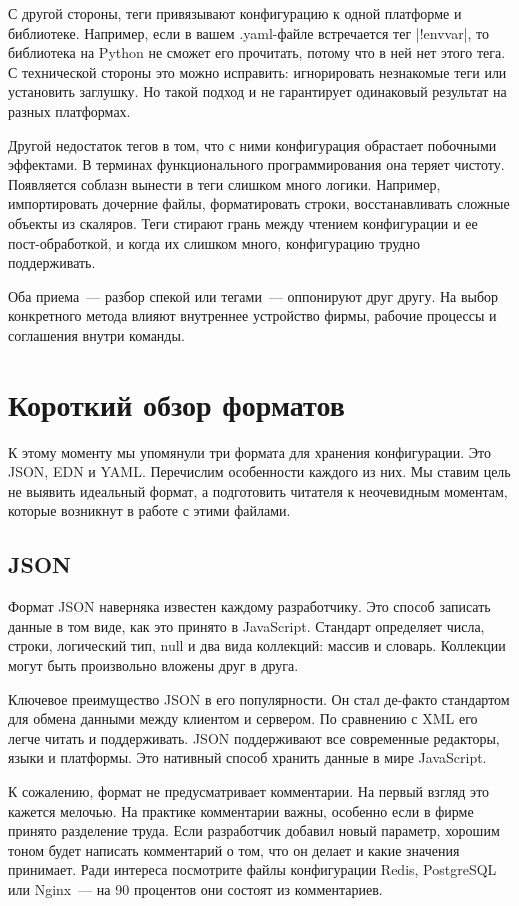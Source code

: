 С другой стороны, теги привязывают конфигурацию к одной платформе и
библиотеке. Например, если в вашем .yaml-файле встречается тег \spverb|!envvar|, то
библиотека на Python не сможет его прочитать, потому что в ней нет этого тега. С
технической стороны это можно исправить: игнорировать незнакомые теги или
установить заглушку. Но такой подход и не гарантирует одинаковый результат на
разных платформах.

Другой недостаток тегов в том, что с ними конфигурация обрастает побочными
эффектами. В терминах функционального программирования она теряет
чистоту. Появляется соблазн вынести в теги слишком много логики. Например,
импортировать дочерние файлы, форматировать строки, восстанавливать сложные
объекты из скаляров. Теги стирают грань между чтением конфигурации и ее
пост-обработкой, и когда их слишком много, конфигурацию трудно поддерживать.

Оба приема~--- разбор спекой или тегами~--- оппонируют друг другу. На выбор
конкретного метода влияют внутреннее устройство фирмы, рабочие процессы и
соглашения внутри команды.

\section{Короткий обзор форматов}

К этому моменту мы упомянули три формата для хранения конфигурации. Это JSON,
EDN и YAML. Перечислим особенности каждого из них. Мы ставим цель не выявить
идеальный формат, а подготовить читателя к неочевидным моментам, которые
возникнут в работе с этими файлами.

\subsection{JSON}

Формат JSON наверняка известен каждому разработчику. Это способ записать данные
в том виде, как это принято в JavaScript. Стандарт определяет числа, строки,
логический тип, null и два вида коллекций: массив и словарь. Коллекции могут
быть произвольно вложены друг в друга.

Ключевое преимущество JSON в его популярности. Он стал де-факто стандартом для
обмена данными между клиентом и сервером. По сравнению с XML его легче читать и
поддерживать. JSON поддерживают все современные редакторы, языки и
платформы. Это нативный способ хранить данные в мире JavaScript.

К сожалению, формат не предусматривает комментарии. На первый взгляд это кажется
мелочью. На практике комментарии важны, особенно если в фирме принято разделение
труда. Если разработчик добавил новый параметр, хорошим тоном будет написать
комментарий о том, что он делает и какие значения принимает. Ради интереса
посмотрите файлы конфигурации Redis, PostgreSQL или Nginx~--- на 90 процентов они
состоят из комментариев.

